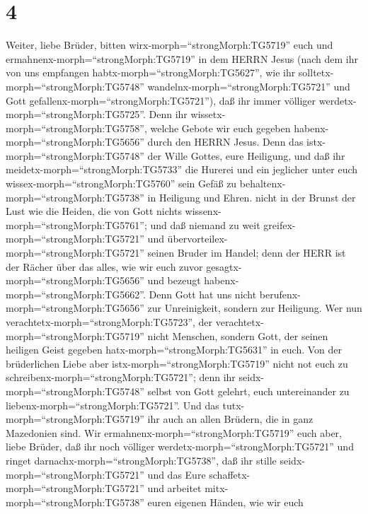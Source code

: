 \hypertarget{section-3}{%
\section{4}\label{section-3}}

 Weiter, liebe Brüder, bitten
wirx-morph=``strongMorph:TG5719'' euch und
ermahnenx-morph=``strongMorph:TG5719'' in dem HERRN Jesus (nach dem ihr
von uns empfangen habtx-morph=``strongMorph:TG5627'', wie ihr
solltetx-morph=``strongMorph:TG5748''
wandelnx-morph=``strongMorph:TG5721'' und Gott
gefallenx-morph=``strongMorph:TG5721''), daß ihr immer völliger
werdetx-morph=``strongMorph:TG5725''.  Denn ihr
wissetx-morph=``strongMorph:TG5758'', welche Gebote wir euch gegeben
habenx-morph=``strongMorph:TG5656'' durch den HERRN Jesus. 
Denn das istx-morph=``strongMorph:TG5748'' der Wille Gottes, eure
Heiligung, und daß ihr meidetx-morph=``strongMorph:TG5733'' die Hurerei
 und ein jeglicher unter euch
wissex-morph=``strongMorph:TG5760'' sein Gefäß zu
behaltenx-morph=``strongMorph:TG5738'' in Heiligung und Ehren.
 nicht in der Brunst der Lust wie die Heiden, die von Gott
nichts wissenx-morph=``strongMorph:TG5761'';  und daß
niemand zu weit greifex-morph=``strongMorph:TG5721'' und
übervorteilex-morph=``strongMorph:TG5721'' seinen Bruder im Handel; denn
der HERR ist der Rächer über das alles, wie wir euch zuvor
gesagtx-morph=``strongMorph:TG5656'' und bezeugt
habenx-morph=``strongMorph:TG5662''.  Denn Gott hat uns
nicht berufenx-morph=``strongMorph:TG5656'' zur Unreinigkeit, sondern
zur Heiligung.  Wer nun
verachtetx-morph=``strongMorph:TG5723'', der
verachtetx-morph=``strongMorph:TG5719'' nicht Menschen, sondern Gott,
der seinen heiligen Geist gegeben hatx-morph=``strongMorph:TG5631'' in
euch.  Von der brüderlichen Liebe aber
istx-morph=``strongMorph:TG5719'' nicht not euch zu
schreibenx-morph=``strongMorph:TG5721''; denn ihr
seidx-morph=``strongMorph:TG5748'' selbst von Gott gelehrt, euch
untereinander zu liebenx-morph=``strongMorph:TG5721''.  Und
das tutx-morph=``strongMorph:TG5719'' ihr auch an allen Brüdern, die in
ganz Mazedonien sind. Wir ermahnenx-morph=``strongMorph:TG5719'' euch
aber, liebe Brüder, daß ihr noch völliger
werdetx-morph=``strongMorph:TG5721''  und ringet
darnachx-morph=``strongMorph:TG5738'', daß ihr stille
seidx-morph=``strongMorph:TG5721'' und das Eure
schaffetx-morph=``strongMorph:TG5721'' und arbeitet
mitx-morph=``strongMorph:TG5738'' euren eigenen Händen, wie wir euch

